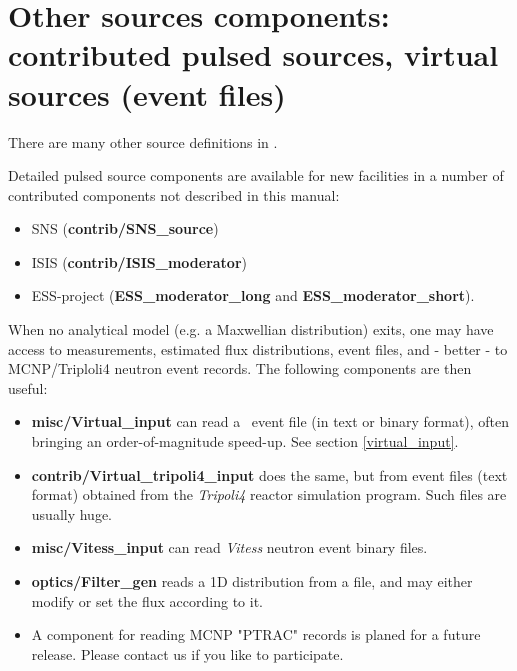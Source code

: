 \newpage


\newpage


\newpage


\newpage


\newpage


\newpage


%

\newpage


\newpage


\newpage
\section{Other sources components: contributed pulsed sources, virtual sources (event files)}
\label{sources-seealso}

There are many other source definitions in \MCS .

Detailed pulsed source components are available for new facilities
in a number of contributed components not described in this manual:
\begin{itemize}
\item SNS ({\bf contrib/SNS\_source})
\item ISIS ({\bf contrib/ISIS\_moderator})
\item ESS-project ({\bf ESS\_moderator\_long} and {\bf  ESS\_moderator\_short}).
\end{itemize}

When no analytical model (e.g. a Maxwellian distribution) exits, 
one may have access to measurements, estimated flux distributions, 
event files, and - better - to MCNP/Triploli4 neutron event records. 
The following components are then useful:

\begin{itemize}
\item{{\bf misc/Virtual\_input} can read a \MCS\ event file 
(in text or binary format), often bringing an order-of-magnitude speed-up. 
See section \ref{virtual_input}.}
\item{{\bf contrib/Virtual\_tripoli4\_input} does the same, but from event files (text format) obtained from the \emph{Tripoli4} \cite{tripoli_webpage} reactor simulation program. Such files are usually huge.}
\item{{\bf misc/Vitess\_input} can read \emph{Vitess} \cite{vitess_webpage} neutron event binary files.}
\item{{\bf optics/Filter\_gen} reads a 1D distribution from a file, and may either modify or set the flux according to it.}
\item{A component for reading MCNP "PTRAC" records is planed for a future release. 
Please contact us if you like to participate.}
\end{itemize}
